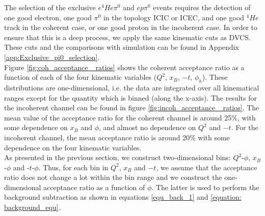 The selection of the exclusive $e^{4}He\pi^{0}$ and $ep\pi^{0}$ events requires the detection of one good electron, one good $\pi^{0}$ in the topology ICIC or ICEC, and one good $^{4}He$ track in the coherent case, or one good proton in the incoherent case. In order to ensure that this is a deep process, we apply the same kinematic cuts as DVCS. These cuts and the comparisons with simulation can be found in Appendix \ref{app:Exclusive_pi0_selection}.\\


Figure \ref{fig:coh_acceptance _ratios} shows the coherent acceptance ratio as a function of each of the four kinematic variables ($Q^{2}$, $x_{B}$, $-t$, $\phi_{h}$). These distributions are one-dimensional, i.e. the data are integrated over all kinematical ranges except for the quantity which is binned (along the x-axis). The results  for the incoherent channel can be found in figure \ref{fig:incoh_acceptance _ratios}. The mean value of the acceptance ratio for the coherent channel is around 25$\%$, with some dependence on $x_{B}$ and $\phi$, and almost no dependence on $Q^{2}$ and $-t$. For the incoherent channel, the mean acceptance ratio is around 20$\%$ with some dependence on the four kinematic variables.\\

As presented in the previous section, we construct two-dimensional bins: $Q^2$-$\phi$, $x_B$-$\phi$ and -$t$-$\phi$. Thus, for each bin in $Q^2$, $x_B$ and $-t$, we assume that the acceptance ratio does not change a lot within the bin range and we construct the one-dimensional acceptance ratio as a function of $\phi$. The latter is used to perform the background subtraction as shown in equations \ref{equ_back_1} and \ref{equation: background_equ}. 


